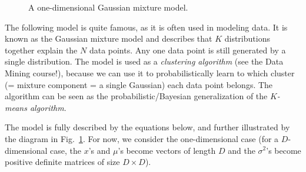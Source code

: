\documentclass[a4paper]{article}
\renewcommand{\v}[1]{\mathbf{\bm #1}}
\begin{document}
\begin{figure}[t]
    \centering
    \caption{A one-dimensional Gaussian mixture model.}
    \label{fig:gmm}
\end{figure}


The following model is quite famous, as it is often used in modeling data. It is known as the Gaussian mixture model and describes that $K$ distributions together explain the $N$ data points. Any one data point is still generated by a single distribution. The model is used as a \emph{clustering algorithm} (see the Data Mining course!), because we can use it to probabilistically learn to which cluster (= mixture component = a single Gaussian) each data point belongs. The algorithm can be seen as the probabilistic/Bayesian generalization of the \emph{$K$-means algorithm}. 

The model is fully described by the equations below, and further illustrated by the diagram in Fig.~\ref{fig:gmm}. For now, we consider the one-dimensional case (for a $D$-dimensional case, the $x$'s and $\mu$'s become vectors of length $D$ and the $\sigma^2$'s become positive definite matrices of size $D\times D$).
\end{document}
